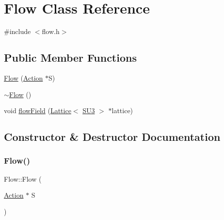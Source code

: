 \hypertarget{class_flow}{}\section{Flow Class Reference}
\label{class_flow}


{\ttfamily \#include $<$flow.\+h$>$}

\subsection*{Public Member Functions}
\begin{DoxyCompactItemize}
\item 
\mbox{\hyperlink{class_flow_a25ae85599c0ae330374f0840efde7ebc}{Flow}} (\mbox{\hyperlink{class_action}{Action}} $\ast$S)
\item 
\mbox{\hyperlink{class_flow_a5991efa6e8cf88c4ef2125cc727db333}{$\sim$\+Flow}} ()
\item 
void \mbox{\hyperlink{class_flow_a284b490ddedc9cf5d0f2ab0660c328f6}{flow\+Field}} (\mbox{\hyperlink{class_lattice}{Lattice}}$<$ \mbox{\hyperlink{class_s_u3}{S\+U3}} $>$ $\ast$lattice)
\end{DoxyCompactItemize}


\subsection{Constructor \& Destructor Documentation}
\mbox{\label{class_flow_a25ae85599c0ae330374f0840efde7ebc}} 
\subsubsection{\texorpdfstring{Flow()}{Flow()}}
{\footnotesize\ttfamily Flow\+::\+Flow (\begin{DoxyParamCaption}\item[{\mbox{\hyperlink{class_action}{Action}} $\ast$}]{S }\end{DoxyParamCaption})}

